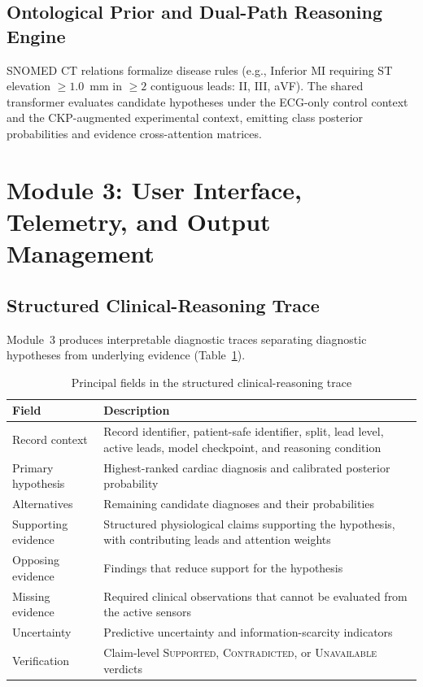 \documentclass{ssnreview}
\begin{document}
\subsection{Ontological Prior and Dual-Path Reasoning Engine}

SNOMED CT relations formalize disease rules (e.g., Inferior MI requiring ST elevation $\ge 1.0$~mm
in $\ge 2$ contiguous leads: II, III, aVF). The shared transformer evaluates candidate
hypotheses under the ECG-only control context and the CKP-augmented experimental context,
emitting class posterior probabilities and evidence cross-attention matrices.

\section{Module 3: User Interface, Telemetry, and Output Management}

\subsection{Structured Clinical-Reasoning Trace}

Module~3 produces interpretable diagnostic traces separating diagnostic hypotheses from underlying
evidence (Table~\ref{tab:trace-fields}).

\begin{table}[H]
  \centering
  \small
  \caption{Principal fields in the structured clinical-reasoning trace}
  \label{tab:trace-fields}
  \begin{tabularx}{\textwidth}{@{}l>{\raggedright\arraybackslash}X@{}}
    \toprule
    \textbf{Field} & \textbf{Description} \\
    \midrule
    Record context & Record identifier, patient-safe identifier, split, lead level,
    active leads, model checkpoint, and reasoning condition \\
    Primary hypothesis & Highest-ranked cardiac diagnosis and calibrated posterior probability \\
    Alternatives & Remaining candidate diagnoses and their probabilities \\
    Supporting evidence & Structured physiological claims supporting the hypothesis,
    with contributing leads and attention weights \\
    Opposing evidence & Findings that reduce support for the hypothesis \\
    Missing evidence & Required clinical observations that cannot be evaluated from the active sensors \\
    Uncertainty & Predictive uncertainty and information-scarcity indicators \\
    Verification & Claim-level \textsc{Supported}, \textsc{Contradicted}, or \textsc{Unavailable} verdicts \\
    \bottomrule
  \end{tabularx}
\end{table}
\end{document}
